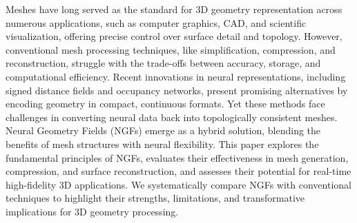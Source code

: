 Meshes have long served as the standard for 3D geometry representation across numerous applications, such as computer graphics, CAD, and scientific visualization, offering precise control over surface detail and topology.  
However, conventional mesh processing techniques, like simplification, compression, and reconstruction, struggle with the trade-offs between accuracy, storage, and computational efficiency.  
Recent innovations in neural representations, including signed distance fields and occupancy networks, present promising alternatives by encoding geometry in compact, continuous formats.  
Yet these methods face challenges in converting neural data back into topologically consistent meshes.  
Neural Geometry Fields (NGFs) emerge as a hybrid solution, blending the benefits of mesh structures with neural flexibility.  
This paper explores the fundamental principles of NGFs, evaluates their effectiveness in mesh generation, compression, and surface reconstruction, and assesses their potential for real-time high-fidelity 3D applications.  
We systematically compare NGFs with conventional techniques to highlight their strengths, limitations, and transformative implications for 3D geometry processing.
